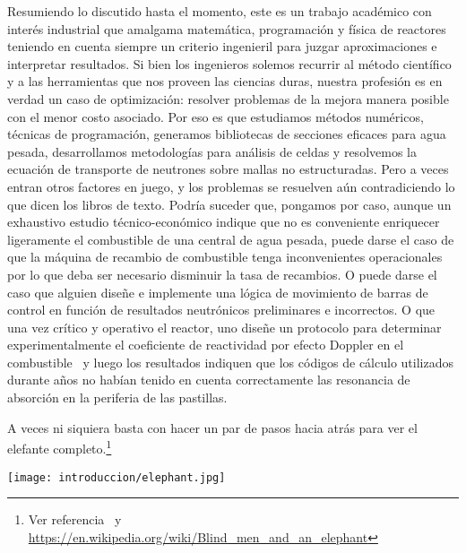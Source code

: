 Resumiendo lo discutido hasta el momento, este es un trabajo académico con interés industrial que amalgama matemática, programación y física de reactores teniendo en cuenta siempre un criterio ingenieril para juzgar aproximaciones e interpretar resultados. Si bien los ingenieros solemos recurrir al método científico y a las herramientas que nos proveen las ciencias duras, nuestra profesión es en verdad un caso de optimización: resolver problemas de la mejora manera posible con el menor costo asociado. Por eso es que estudiamos métodos numéricos, técnicas de programación, generamos bibliotecas de secciones eficaces para agua pesada, desarrollamos metodologías para análisis de celdas y resolvemos la ecuación de transporte de neutrones sobre mallas no estructuradas. Pero a veces entran otros factores en juego, y los problemas se resuelven aún contradiciendo lo que dicen los libros de texto. Podría suceder que, pongamos por caso, aunque un exhaustivo estudio técnico-económico indique que no es conveniente enriquecer ligeramente el combustible de una central de agua pesada, puede darse el caso de que la máquina de recambio de combustible tenga inconvenientes operacionales por lo que deba ser necesario disminuir la tasa de recambios. O puede darse el caso que alguien diseñe e implemente una lógica de movimiento de barras de control en función de resultados neutrónicos preliminares e incorrectos. O que una vez crítico y operativo el reactor, uno diseñe un protocolo para determinar experimentalmente el coeficiente de reactividad por efecto Doppler en el combustible~\cite{doppler2013} y luego los resultados indiquen que los códigos de cálculo utilizados durante años no habían tenido en cuenta correctamente las resonancia de absorción en la periferia de las pastillas. 

\medskip

A veces ni siquiera basta con hacer un par de pasos hacia atrás para ver el elefante completo.\footnote{Ver referencia~\cite{chaco} y \url{https://en.wikipedia.org/wiki/Blind_men_and_an_elephant}}


\vfill
\vfill
\vfill
\vfill
\vfill
\hspace{\fill}\texttt{[image: introduccion/elephant.jpg]}\hspace{\fill}

